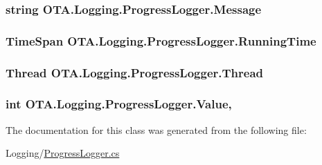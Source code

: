 \subsubsection[{Message}]{\setlength{\rightskip}{0pt plus 5cm}string O\+T\+A.\+Logging.\+Progress\+Logger.\+Message\hspace{0.3cm}{\ttfamily [get]}}\label{class_o_t_a_1_1_logging_1_1_progress_logger_acddbe8d1af736e85288bd5c38e0365aa}
\hypertarget{class_o_t_a_1_1_logging_1_1_progress_logger_a9ade6fc0291b625f927e1dd6d4539960}{}
\subsubsection[{Running\+Time}]{\setlength{\rightskip}{0pt plus 5cm}Time\+Span O\+T\+A.\+Logging.\+Progress\+Logger.\+Running\+Time\hspace{0.3cm}{\ttfamily [get]}}\label{class_o_t_a_1_1_logging_1_1_progress_logger_a9ade6fc0291b625f927e1dd6d4539960}
\hypertarget{class_o_t_a_1_1_logging_1_1_progress_logger_ae164f5ffd70a7f797043bd3e24ab9cca}{}
\subsubsection[{Thread}]{\setlength{\rightskip}{0pt plus 5cm}Thread O\+T\+A.\+Logging.\+Progress\+Logger.\+Thread\hspace{0.3cm}{\ttfamily [get]}}\label{class_o_t_a_1_1_logging_1_1_progress_logger_ae164f5ffd70a7f797043bd3e24ab9cca}
\hypertarget{class_o_t_a_1_1_logging_1_1_progress_logger_a24093985bd035b946c2023790d3db41f}{}
\subsubsection[{Value}]{\setlength{\rightskip}{0pt plus 5cm}int O\+T\+A.\+Logging.\+Progress\+Logger.\+Value\hspace{0.3cm}{\ttfamily [get]}, {\ttfamily [set]}}\label{class_o_t_a_1_1_logging_1_1_progress_logger_a24093985bd035b946c2023790d3db41f}


The documentation for this class was generated from the following file\+:\begin{DoxyCompactItemize}
\item 
Logging/\hyperlink{_progress_logger_8cs}{Progress\+Logger.\+cs}\end{DoxyCompactItemize}
